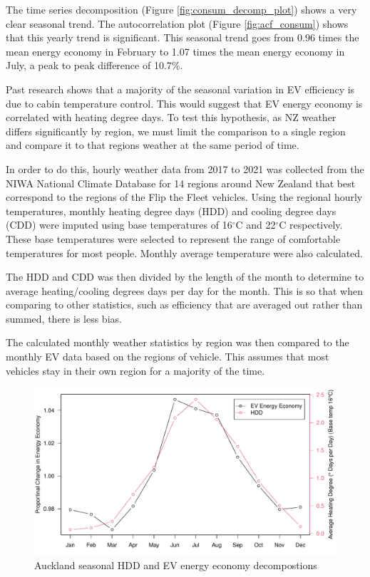 \documentclass[
]{article}
\begin{document}
The time series decomposition (Figure \ref{fig:consum_decomp_plot})
shows a very clear seasonal trend. The autocorrelation plot (Figure
\ref{fig:acf_consum}) shows that this yearly trend is significant. This
seasonal trend goes from 0.96 times the mean energy economy in February
to 1.07 times the mean energy economy in July, a peak to peak difference
of 10.7\%.

Past research shows that a majority of the seasonal variation in EV
efficiency is due to cabin temperature control\cite{ev_range}. This
would suggest that EV energy economy is correlated with heating degree
days. To test this hypothesis, as NZ weather differs significantly by
region, we must limit the comparison to a single region and compare it
to that regions weather at the same period of time.

In order to do this, hourly weather data from 2017 to 2021 was collected
from the NIWA National Climate Database for 14 regions around New
Zealand that best correspond to the regions of the Flip the Fleet
vehicles. Using the regional hourly temperatures, monthly heating degree
days (HDD) and cooling degree days (CDD) were imputed using base
temperatures of 16\(^\circ\)C and 22\(^\circ\)C respectively. These base
temperatures were selected to represent the range of comfortable
temperatures for most people. Monthly average temperature were also
calculated.

The HDD and CDD was then divided by the length of the month to determine
to average heating/cooling degrees days per day for the month. This is
so that when comparing to other statistics, such as efficiency that are
averaged out rather than summed, there is less bias.

The calculated monthly weather statistics by region was then compared to
the monthly EV data based on the regions of vehicle. This assumes that
most vehicles stay in their own region for a majority of the time.

\begin{figure}
\centering
\includegraphics{mixed_model_files/figure-latex/consum_HDD_plot-1.pdf}
\caption{Auckland seasonal HDD and EV energy economy
decompostions\label{fig:consum_HDD_plot}}
\end{figure}
\end{document}
